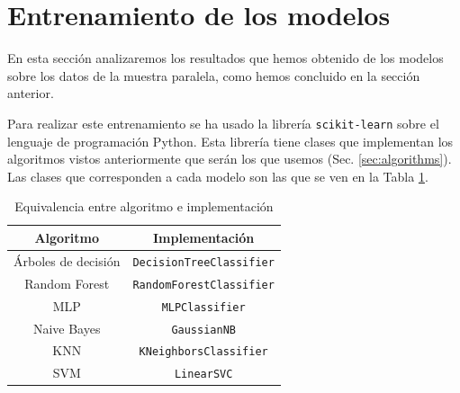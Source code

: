\section{Entrenamiento de los modelos}

En esta sección analizaremos los resultados que hemos obtenido de los modelos sobre los datos de la muestra paralela, como hemos concluido en la sección anterior.

Para realizar este entrenamiento se ha usado la librería \texttt{scikit-learn} sobre el lenguaje de programación Python. Esta librería tiene clases que implementan los algoritmos vistos anteriormente que serán los que usemos (Sec. \ref{sec:algorithms}). Las clases que corresponden a cada modelo son las que se ven en la Tabla \ref{tab:equiv_models}.

\begin{table}
    \centering
    \begin{tabular}{c|c}
        Algoritmo & Implementación \\
        \hline\hline
        Árboles de decisión & \texttt{DecisionTreeClassifier} \cite{scikittrees} \\
        Random Forest & \texttt{RandomForestClassifier} \cite{scikitforest} \\
        MLP & \texttt{MLPClassifier} \cite{scikitmlp} \\
        Naive Bayes & \texttt{GaussianNB} \cite{scikitnaivebayes} \\
        KNN & \texttt{KNeighborsClassifier} \cite{scikitknn} \\
        SVM & \texttt{LinearSVC} \cite{scikitsvm}
    \end{tabular}
    \caption{Equivalencia entre algoritmo e implementación}
    \label{tab:equiv_models}
\end{table}


